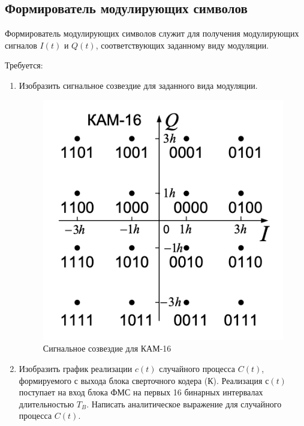 \documentclass[a4paper, 12pt]{article}
\begin{document}
\subsection{Формирователь модулирующих символов}
Формирователь модулирующих символов служит для получения
модулирующих сигналов $I(t)$ и $Q(t)$, соответствующих заданному
виду модуляции.

Требуется:
\begin{enumerate}
  \item Изобразить сигнальное созвездие для заданного вида модуляции.
  \begin{figure}[H]
    \centering
    \includegraphics[scale=0.6]{cam_16}
    \caption{Сигнальное созвездие для КАМ-16} 
    \label{fig:cam_16}
  \end{figure}

  \item Изобразить график реализации $c(t)$ случайного процесса
  $C(t)$, формируемого с выхода блока сверточного кодера (К). 
  Реализация $с(t)$ поступает на вход блока ФМС на первых 
  16 бинарных интервалах длительностью $T_B$. 
  Написать аналитическое выражение для 
  случайного процесса $C(t)$.
  \begin{figure}[H]
    \centering
\end{figure}
\end{enumerate}
\end{document}
